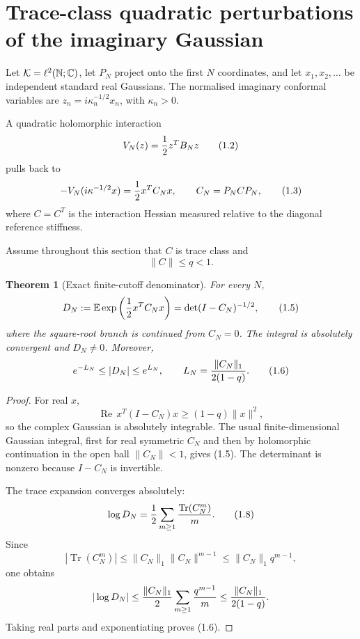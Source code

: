 \documentclass[11pt]{article}
\newtheorem{theorem}{Theorem}[section]
\theoremstyle{remark}
\begin{document}
\section{Trace-class quadratic perturbations of the imaginary
Gaussian}
\label{sec:v12v1-quadratic}

Let \({\cal K}=\ell^2(\mathbb N;\mathbb C)\), let \(P_N\) project onto
the first \(N\) coordinates, and let \(x_1,x_2,\ldots\) be independent
standard real Gaussians.  The normalised imaginary conformal variables
are \(z_n=i\kappa_n^{-1/2}x_n\), with \(\kappa_n>0\).

A quadratic holomorphic interaction
\[
                              V_N(z)={1\over2}z^TB_Nz         \tag{1.2}
\]
pulls back to
\[
                              -V_N(i\kappa^{-1/2}x)
                              ={1\over2}x^TC_Nx,\qquad
 C_N=P_NCP_N,                                                \tag{1.3}
\]
where \(C=C^T\) is the interaction Hessian measured relative to the
diagonal reference stiffness.

Assume throughout this section that \(C\) is trace class and
\[
                              \|C\|\le q<1.                  \tag{1.4}
\]

\begin{theorem}[Exact finite-cutoff denominator]
\label{thm:v12v1-denominator}
For every \(N\),
\[
 D_N
 :=\mathbb E\exp\left({1\over2}x^TC_Nx\right)
 =\det(I-C_N)^{-1/2},                                       \tag{1.5}
\]
where the square-root branch is continued from \(C_N=0\).
The integral is absolutely convergent and \(D_N\ne0\).
Moreover,
\[
 e^{-L_N}\le|D_N|\le e^{L_N},\qquad
 L_N={\|C_N\|_1\over2(1-q)}.                                \tag{1.6}
\]
\end{theorem}

\begin{proof}
For real \(x\),
\[
 \operatorname{Re}\,x^T(I-C_N)x
 \ge(1-q)\|x\|^2,                                           \tag{1.7}
\]
so the complex Gaussian is absolutely integrable.  The usual
finite-dimensional Gaussian integral, first for real symmetric
\(C_N\) and then by holomorphic continuation in the open ball
\(\|C_N\|<1\), gives (1.5).  The determinant is nonzero because
\(I-C_N\) is invertible.

The trace expansion converges absolutely:
\[
 \log D_N
 ={1\over2}\sum_{m\ge1}{\operatorname{Tr}(C_N^m)\over m}.    \tag{1.8}
\]
Since
\[
 |\operatorname{Tr}(C_N^m)|
 \le\|C_N\|_1\|C_N\|^{m-1}
 \le\|C_N\|_1q^{m-1},
\]
one obtains
\[
 |\log D_N|
 \le{\|C_N\|_1\over2}
       \sum_{m\ge1}{q^{m-1}\over m}
 \le{\|C_N\|_1\over2(1-q)}.
\]
Taking real parts and exponentiating proves (1.6).
\end{proof}
\end{document}
